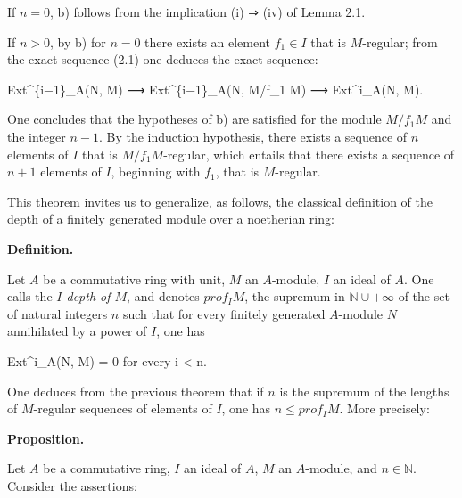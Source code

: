 \documentclass[
]{article}
\newenvironment{Shaded}{}{}
\newcommand{\NormalTok}[1]{#1}
\begin{document}
If \(n = 0\), b) follows from the implication (i) ⇒ (iv) of Lemma 2.1.

If \(n > 0\), by b) for \(n = 0\) there exists an element
\(f_{1} \in I\) that is \(M\)-regular; from the exact sequence (2.1) one
deduces the exact sequence:

\begin{Shaded}
\begin{Highlighting}[]
\NormalTok{Ext\^{}\{i−1\}\_A(N, M) ⟶ Ext\^{}\{i−1\}\_A(N, M/f\_1 M) ⟶ Ext\^{}i\_A(N, M).}
\end{Highlighting}
\end{Shaded}

One concludes that the hypotheses of b) are satisfied for the module
\(M/f_{1} M\) and the integer \(n - 1\). By the induction hypothesis,
there exists a sequence of \(n\) elements of \(I\) that is
\(M/f_{1} M\)-regular, which entails that there exists a sequence of
\(n + 1\) elements of \(I\), beginning with \(f_{1}\), that is
\(M\)-regular.

This theorem invites us to generalize, as follows, the classical
definition of the depth of a finitely generated module over a noetherian
ring:

\textbf{Definition.}

Let \(A\) be a commutative ring with unit, \(M\) an \(A\)-module, \(I\)
an ideal of \(A\). One calls the \emph{\(I\)-depth of \(M\)}, and
denotes \(prof_{I} M\), the supremum in \(\mathbb{N} \cup {+\infty}\) of
the set of natural integers \(n\) such that for every finitely generated
\(A\)-module \(N\) annihilated by a power of \(I\), one has

\begin{Shaded}
\begin{Highlighting}[]
\NormalTok{Ext\^{}i\_A(N, M) = 0 for every i \textless{} n.}
\end{Highlighting}
\end{Shaded}

One deduces from the previous theorem that if \(n\) is the supremum of
the lengths of \(M\)-regular sequences of elements of \(I\), one has
\(n \leqslant prof_{I} M\). More precisely:

\textbf{Proposition.}

Let \(A\) be a commutative ring, \(I\) an ideal of \(A\), \(M\) an
\(A\)-module, and \(n \in \mathbb{N}\). Consider the assertions:
\end{document}

